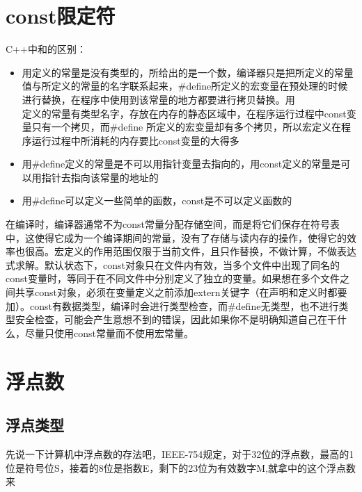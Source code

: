 \section{const限定符}

C++中和的区别：

\begin{itemize}
\item 用定义的常量是没有类型的，所给出的是一个数，编译器只是把所定义的常量值与所定义的常量的名字联系起来，\#def\/ine所定义的宏变量在预处理的时候进行替换，在程序中使用到该常量的地方都要进行拷贝替换。用\\ 定义的常量有类型名字，存放在内存的静态区域中，在程序运行过程中const变量只有一个拷贝，而\#def\/ine 所定义的宏变量却有多个拷贝，所以宏定义在程序运行过程中所消耗的内存要比const变量的大得多
\item 用\#def\/ine定义的常量是不可以用指针变量去指向的，用const定义的常量是可以用指针去指向该常量的地址的
\item 用\#def\/ine可以定义一些简单的函数，const是不可以定义函数的
\end{itemize}

在编译时，编译器通常不为const常量分配存储空间，而是将它们保存在符号表中，这使得它成为一个编译期间的常量，没有了存储与读内存的操作，使得它的效率也很高。宏定义的作用范围仅限于当前文件，且只作替换，不做计算，不做表达式求解。默认状态下，const对象只在文件内有效，当多个文件中出现了同名的const变量时，等同于在不同文件中分别定义了独立的变量。如果想在多个文件之间共享const对象，必须在变量定义之前添加extern关键字（在声明和定义时都要加）。const有数据类型，编译时会进行类型检查，而\#def\/ine无类型，也不进行类型安全检查，可能会产生意想不到的错误，因此如果你不是明确知道自己在干什么，尽量只使用const常量而不使用宏常量。

\section{浮点数}

\addtocounter{subsection}{1}

\subsection{浮点类型}

先说一下计算机中浮点数的存法吧，IEEE-754\cite{IEEE754}规定，对于32位的浮点数，最高的1位是符号位S，接着的8位是指数E，剩下的23位为有效数字M,就拿中的这个浮点数来

